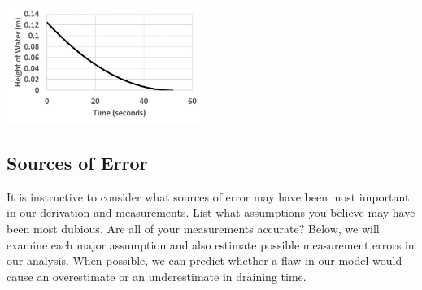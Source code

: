 \documentclass{ximera}
\begin{document}
\begin{image}
 \includegraphics[height=1.5in]{drainingTank3.jpg}
\end{image}
 
\subsection*{Sources of Error}
 
It is instructive to consider what sources of error may have been most important in our derivation and measurements.  List what assumptions you believe may have been most dubious.  Are all of your measurements accurate?  Below, we will examine each major assumption and also estimate possible measurement errors in our analysis.  When possible, we can predict whether a flaw in our model would cause an overestimate or an underestimate in draining time.
 
\end{document}
